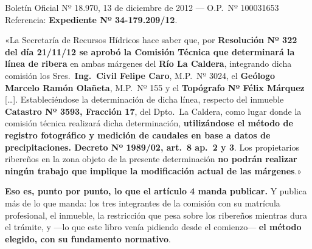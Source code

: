 \begin{ficha}{Boletín Oficial Nº 18.970, 13 de diciembre de 2012 --- O.P.\ Nº 100031653}
Referencia: \textbf{Expediente Nº 34-179.209/12}.

«La Secretaría de Recursos Hídricos hace saber que, por \textbf{Resolución Nº 322 del día
21/11/12 se aprobó la Comisión Técnica que determinará la línea de ribera} en ambas márgenes
del \textbf{Río La Caldera}, integrando dicha comisión los Sres.\ \textbf{Ing.\ Civil Felipe
Caro}, M.P.\ Nº 3024, el \textbf{Geólogo Marcelo Ramón Olañeta}, M.P.\ Nº 155 y el
\textbf{Topógrafo Nº Félix Márquez} [\ldots]. Estableciéndose la determinación de
dicha línea, respecto del inmueble \textbf{Catastro Nº 3593, Fracción 17}, del Dpto.\ La
Caldera, como lugar donde la comisión técnica realizará dicha determinación,
\textbf{utilizándose el método de registro fotográfico y medición de caudales en base a datos
de precipitaciones. Decreto Nº 1989/02, art.\ 8 ap.\ 2 y 3}. Los propietarios ribereños en la
zona objeto de la presente determinación \textbf{no podrán realizar ningún trabajo que implique
la modificación actual de las márgenes}.»
\end{ficha}

\textbf{Eso es, punto por punto, lo que el artículo 4 manda publicar.} Y publica más de lo que
manda: los tres integrantes de la comisión con su matrícula profesional, el inmueble, la
restricción que pesa sobre los ribereños mientras dura el trámite, y ---lo que este libro venía
pidiendo desde el comienzo--- \textbf{el método elegido, con su fundamento normativo}.


